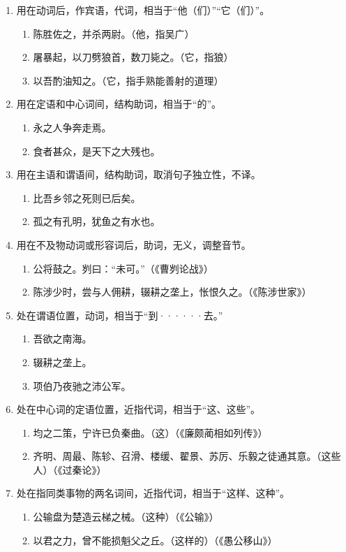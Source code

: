 \noindent
[\ 之\ ]
\begin{enumerate}[label=(\arabic*)]
	\item 用在动词后，作宾语，代词，相当于“他（们）”“它（们）”。
	\begin{enumerate}[label=\textcircled{\arabic*}]
		\item 陈胜佐之，并杀两尉。（他，指吴广）
		\item 屠暴起，以刀劈狼首，数刀毙之。（它，指狼）
		\item 以吾酌油知之。（它，指手熟能善射的道理）
	\end{enumerate}
	\item 用在定语和中心词间，结构助词，相当于“的”。
	\begin{enumerate}[label=\textcircled{\arabic*}]
		\item 永之人争奔走焉。
		\item 食者甚众，是天下之大残也。
	\end{enumerate}
	\item 用在主语和谓语间，结构助词，取消句子独立性，不译。
	\begin{enumerate}[label=\textcircled{\arabic*}]
		\item 比吾乡邻之死则已后矣。
		\item 孤之有孔明，犹鱼之有水也。
	\end{enumerate}
	\item 用在不及物动词或形容词后，助词，无义，调整音节。
	\begin{enumerate}[label=\textcircled{\arabic*}]
		\item 公将鼓之。刿曰：“未可。”（《曹刿论战》）
		\item 陈涉少时，尝与人佣耕，辍耕之垄上，怅恨久之。（《陈涉世家》）
	\end{enumerate}
	\item 处在谓语位置，动词，相当于“到······去。”
	\begin{enumerate}[label=\textcircled{\arabic*}]
		\item 吾欲之南海。
		\item 辍耕之垄上。
		\item 项伯乃夜驰之沛公军。
	\end{enumerate}
	\item 处在中心词的定语位置，近指代词，相当于“这、这些”。
	\begin{enumerate}[label=\textcircled{\arabic*}]
		\item 均之二策，宁许已负秦曲。（这）（《廉颇蔺相如列传》）
		\item 齐明、周最、陈轸、召滑、楼缓、翟景、苏厉、乐毅之徒通其意。（这些人）（《过秦论》）
	\end{enumerate}
	\item 处在指同类事物的两名词间，近指代词，相当于“这样、这种”。
	\begin{enumerate}[label=\textcircled{\arabic*}]
		\item 公输盘为楚造云梯之械。（这种）（《公输》）
		\item 以君之力，曾不能损魁父之丘。（这样的）（《愚公移山》）
	\end{enumerate}
\end{enumerate}

